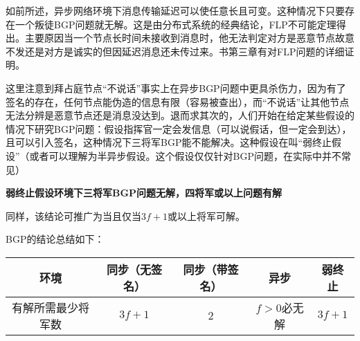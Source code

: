 如前所述，异步网络环境下消息传输延迟可以使任意长且可变。这种情况下只要存在一个叛徒BGP问题就无解。这是由分布式系统的经典结论，FLP不可能定理得出\cite{fischer1982impossibility}。主要原因当一个节点长时间未接收到消息时，他无法判定对方是恶意节点故意不发还是对方是诚实的但因延迟消息还未传过来。书\cite{wattenhofer2016science}第三章有对FLP问题的详细证明。	

这里注意到拜占庭节点“不说话”事实上在异步BGP问题中更具杀伤力，因为有了签名的存在，任何节点能伪造的信息有限（容易被查出），而“不说话”让其他节点无法分辨是恶意节点还是消息没达到。退而求其次的，人们开始在给定某些假设的情况下研究BGP问题：假设指挥官一定会发信息（可以说假话，但一定会到达），且可以引入签名，这种情况下三将军BGP能不能解决。这种假设在\cite{zhihuBFT}叫“弱终止假设”（或者可以理解为半异步假设。这个假设仅仅针对BGP问题，在实际中并不常见）

\textbf{弱终止假设环境下三将军BGP问题无解，四将军或以上问题有解}

同样，该结论可推广为当且仅当$3f+1$或以上将军可解。

BGP的结论总结如下：

\begin{tabular}{|c|c|c|c|c|}
环境	& 同步（无签名）& 同步（带签名）& 异步  & 弱终止 \\\hline
有解所需最少将军数 &  $3f+1$ &   2   &   $f>0$必无解  &    $3f+1$ \\    
\end{tabular}
	















